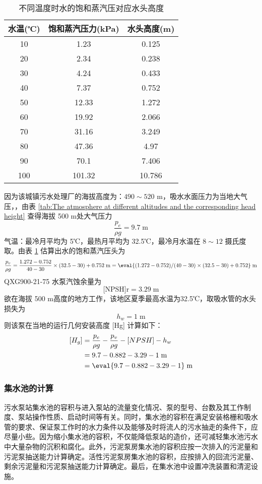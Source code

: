 \begin{table}[H]
  \centering
  \caption{不同温度时水的饱和蒸汽压对应水头高度\cite{水泵最大安装高度如何计算}}
    \begin{tabular}{ccc}
    \toprule
    水温(℃) & 饱和蒸汽压力(kPa) & 水头高度(m) \\
    \midrule
    10    & 1.23  & 0.125 \\
    20    & 2.34  & 0.238 \\
    30    & 4.24  & 0.433 \\
    40    & 7.37  & 0.752 \\
    50    & 12.33 & 1.272 \\
    60    & 19.92 & 2.066 \\
    70    & 31.16 & 3.249 \\
    80    & 47.36 & 4.97 \\
    90    & 70.1  & 7.406 \\
    100   & 101.32 & 10.786 \\
    \bottomrule
    \end{tabular}
	\label{tab:The saturated vapor pressure of water at different temperatures corresponds to the height of the head}
\end{table}%

因为该城镇污水处理厂的海拔高度为：$490 \sim 520$ m，吸水水面压力为当地大气压，，由表 \ref{tab:The atmosphere at different altitudes and the corresponding head height} 查得海拔 500 m处大气压力
\[\dfrac{p_e}{\rho g} = 9.7 \;\text{m}\]
气温：最冷月平均为 5℃，最热月平均为 32.5℃，最冷月水温在 $8 \sim 12$ 摄氏度取。由表 \ref{tab:The saturated vapor pressure of water at different temperatures corresponds to the height of the head} 估算出水的饱和蒸汽压头为
$$\dfrac{p_v}{\rho g} = \dfrac{1.272-0.752}{40-30}\times (32.5-30)+0.752 \;\text{m} = \eval{(1.272-0.752)/(40-30)\times (32.5-30)+0.752} \;\text{m}$$
QXG900-21-75 水泵汽蚀余量为 $$\text{[NPSH]r}=3.29 \;\text{m}$$
欲在海拔 500 m高度的地方工作，该地区夏季最高水温为32.5℃，取吸水管的水头损失为 $$h_w = 1 \;\text{m}$$
则该泵在当地的运行几何安装高度 [Hg] 计算如下：
\begin{align*}
	\left[H_g\right] &=\dfrac{p_e}{\rho g}-\dfrac{p_v}{\rho g}-\left[NPSH\right]-h_w \\
	&= 9.7-0.882-3.29-1 \;\text{m} \\
	&= \eval{9.7-0.882-3.29-1} \;\text{m}
\end{align*}


\subsubsection{集水池的计算}
污水泵站集水池的容积与进入泵站的流量变化情况、泵的型号、台数及其工作制度、泵站操作性质、启动时间等有关。同时，集水池的容积在满足安装格栅和吸水管的要求、保证泵工作时的水力条件以及能够及时将流人的污水抽走的条件下，应尽量小些。因为缩小集水池的容积，不仅能降低泵站的造价，还可减轻集水池污水中大量杂物的沉积和腐化。此外，污泥泵房集水池的容积应按一次排入的污泥量和污泥泵抽送能力计算确定。活性污泥泵房集水池的容积，应按排入的回流污泥量、剩余污泥量和污泥泵抽送能力计算确定。最后，在集水池中设置冲洗装置和清泥设施\cite{GB500142021}。

